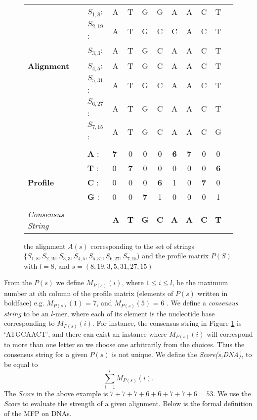 \documentclass{llncs}
\begin{document}
{\begin{figure}[h]
\begin{center}
\begin{small}
\begin{tabular}{l l l c c c c c c c c}
					&$S_{1,8}$: 	&	A&T&G&G&A&A&C&T\\
					&$S_{2,19}$:	&	A&T&G&C&C&A&C&T\\
					&$S_{3,3}$:	&	A&T&G&C&A&A&C&T\\
\textbf{Alignment}	&	$S_{4,5}$: &	A&T&G&C&A&A&C&T\\
					&	$S_{5,31}$: &	A&T&G&C&A&A&C&T\\
					&$S_{6,27}$: &	A&T&G&C&A&A&C&T\\
					&	$S_{7,15}$: &	A&T&G&C&A&A&C&G\\
					\hline \\
					& \textbf{A}	: &	\textbf{7}&0&0&0&\textbf{6}&\textbf{7}&0&0 \\
					& \textbf{T}	: &	0&\textbf{7}&0&0&0&0&0&\textbf{6}\\
\textbf{Profile}	& \textbf{C}	: &	0&0&0&\textbf{6}&1&0&\textbf{7}&0\\
					& \textbf{G}	: &	0&0&\textbf{7}&1&0&0&0&1\\
					\hline \\
\textit{Consensus String}		&& \textbf{A} & \textbf{T} & \textbf{G} & \textbf{C}& \textbf{A} & \textbf{A}& \textbf{C}&\textbf{T} \\
					
\end{tabular}
\end{small}
\caption{the alignment  $A(s)$ corresponding to the set of strings $\{S_{1,8}, S_{2,19}, S_{3,3} ,S_{4,5}, S_{5,31}, S_{6,27}, S_{7,15})$ and the  profile matrix $P(S)$ with $l=8$, and $s=(8,19,3,5,31,27,15)$}
\label{alignment-profile}
\end{center}
\end{figure}

From the $P(s)$ we define $M_{P(s)}(i)$, where $1\leq i\leq l$, be the maximum number at $i$th column of the profile matrix (elements of  $P(s)$ written in boldface) e.g. $M_{P(s)}(1)$ = 7, and $M_{P(s)}(5)$ = 6 .  We define a \textit{consensus string} to be an $l$-mer, where each of its element is the nucleotide base corresponding to $M_{P(s)}(i)$. For instance, the consensus string in Figure \ref{alignment-profile} is `ATGCAACT', and there can exist an instance where $M_{P(s)}(i)$ will correspond to more than one letter so we choose one arbitrarily from the choices. Thus the consensus string for a given $P(s)$ is not unique. We define the \textit{Score(s,DNA)}, to be equal to $$\sum^{l}_{i=1} M_{P(s)}(i).$$ The \textit{Score} in the above example is $7+7+7+6+6+7+7+6= 53$. We use the \textit{Score} to evaluate the strength of a given alignment. Below is the formal definition of the MFP on DNAs.


}
\end{document}
